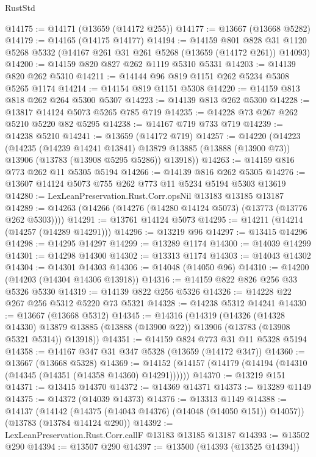 \begin{lexlean}{RustStd}
\begin{coremodule}
@14175 := @14171 (@13659 (@14172 @255))
@14177 := @13667 (@13668 @5282)
@14179 := @14165 (@14175 @14177)
@14194 := @14159
    @801
    @828
    @31
    @1120
    @5268
    @5332
    (@14167 @261 @31 @261 @5268 (@13659 (@14172 @261)) @14093)
@14200 := @14159 @820 @827 @262 @1119 @5310 @5331
@14203 := @14139 @820 @262 @5310
@14211 := @14144 @96 @819 @1151 @262 @5234 @5308 @5265 @1174
@14214 := @14154 @819 @1151 @5308
@14220 := @14159 @813 @818 @262 @264 @5300 @5307
@14223 := @14139 @813 @262 @5300
@14228 := @13817 @14124 @5073 @5265 @785 @719
@14235 := @14228 @73 @267 @262 @5210 @5220 @82 @5295
@14238 := @14167 @719 @733 @719
@14239 := @14238 @5210
@14241 := @13659 (@14172 @719)
@14257 := @14220
    (@14223
      (@14235
        (@14239 @14241 @13841)
        @13879
        @13885
        (@13888 (@13900 @73))
        @13906
        (@13783 (@13908 @5295 @5286))
        @13918))
@14263 := @14159 @816 @773 @262 @11 @5305 @5194
@14266 := @14139 @816 @262 @5305
@14276 := @13607 @14124 @5073 @755 @262 @773 @11 @5234 @5194 @5303 @13619
@14280 := LexLeanPreservation.Rust.Corr.opsNil @13183 @13185 @13187
@14289 := @14263 (@14266 (@14276 (@14280 @14124 @5073) (@13773 (@13776 @262 @5303))))
@14291 := @13761 @14124 @5073
@14295 := @14211 (@14214 (@14257 (@14289 @14291)))
@14296 := @13219 @96
@14297 := @13415 @14296
@14298 := @14295 @14297
@14299 := @13289 @1174
@14300 := @14039 @14299
@14301 := @14298 @14300
@14302 := @13313 @1174
@14303 := @14043 @14302
@14304 := @14301 @14303
@14306 := @14048 (@14050 @96)
@14310 := @14200 (@14203 (@14304 @14306 @13918))
@14316 := @14159 @822 @826 @256 @33 @5326 @5330
@14319 := @14139 @822 @256 @5326
@14326 := @14228 @22 @267 @256 @5312 @5220 @73 @5321
@14328 := @14238 @5312 @14241
@14330 := @13667 (@13668 @5312)
@14345 := @14316
    (@14319
      (@14326
        (@14328 @14330)
        @13879
        @13885
        (@13888 (@13900 @22))
        @13906
        (@13783 (@13908 @5321 @5314))
        @13918))
@14351 := @14159 @824 @773 @31 @11 @5328 @5194
@14358 := @14167 @347 @31 @347 @5328 (@13659 (@14172 @347))
@14360 := @13667 (@13668 @5328)
@14369 := @14152 (@14157 (@14179 (@14194 (@14310 (@14345 (@14351 (@14358 @14360) @14291))))))
@14370 := @13219 @151
@14371 := @13415 @14370
@14372 := @14369 @14371
@14373 := @13289 @1149
@14375 := @14372 (@14039 @14373)
@14376 := @13313 @1149
@14388 := @14137
    (@14142 (@14375 (@14043 @14376) (@14048 (@14050 @151)) @14057))
    (@13783 (@13784 @14124 @290))
@14392 := LexLeanPreservation.Rust.Corr.callF @13183 @13185 @13187
@14393 := @13502 @290
@14394 := @13507 @290
@14397 := @13500 (@14393 (@13525 @14394))

\end{coremodule}
\end{lexlean}
